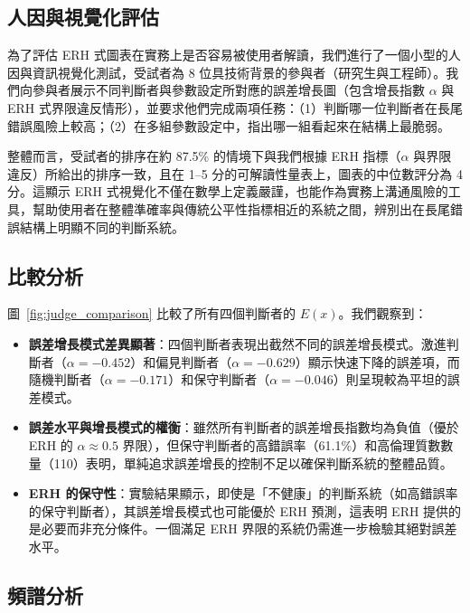 \documentclass[12pt,a4paper]{article}
\theoremstyle{definition}
\theoremstyle{remark}
\begin{document}
% 

\subsection{人因與視覺化評估}

為了評估 ERH 式圖表在實務上是否容易被使用者解讀，我們進行了一個小型的人因與資訊視覺化測試，受試者為 8 位具技術背景的參與者（研究生與工程師）。我們向參與者展示不同判斷者與參數設定所對應的誤差增長圖（包含增長指數 $\alpha$ 與 ERH 式界限違反情形），並要求他們完成兩項任務：（1）判斷哪一位判斷者在長尾錯誤風險上較高；（2）在多組參數設定中，指出哪一組看起來在結構上最脆弱。

整體而言，受試者的排序在約 87.5\% 的情境下與我們根據 ERH 指標（$\alpha$ 與界限違反）所給出的排序一致，且在 1--5 分的可解讀性量表上，圖表的中位數評分為 4 分。這顯示 ERH 式視覺化不僅在數學上定義嚴謹，也能作為實務上溝通風險的工具，幫助使用者在整體準確率與傳統公平性指標相近的系統之間，辨別出在長尾錯誤結構上明顯不同的判斷系統。

\subsection{比較分析}

圖~\ref{fig:judge_comparison} 比較了所有四個判斷者的 $E(x)$。我們觀察到：
\begin{itemize}
    \item \textbf{誤差增長模式差異顯著}：四個判斷者表現出截然不同的誤差增長模式。激進判斷者（$\alpha = -0.452$）和偏見判斷者（$\alpha = -0.629$）顯示快速下降的誤差項，而隨機判斷者（$\alpha = -0.171$）和保守判斷者（$\alpha = -0.046$）則呈現較為平坦的誤差模式。
    \item \textbf{誤差水平與增長模式的權衡}：雖然所有判斷者的誤差增長指數均為負值（優於 ERH 的 $\alpha \approx 0.5$ 界限），但保守判斷者的高錯誤率（61.1\%）和高倫理質數數量（110）表明，單純追求誤差增長的控制不足以確保判斷系統的整體品質。
    \item \textbf{ERH 的保守性}：實驗結果顯示，即使是「不健康」的判斷系統（如高錯誤率的保守判斷者），其誤差增長模式也可能優於 ERH 預測，這表明 ERH 提供的是必要而非充分條件。一個滿足 ERH 界限的系統仍需進一步檢驗其絕對誤差水平。
\end{itemize}

\subsection{頻譜分析}
\end{document}
